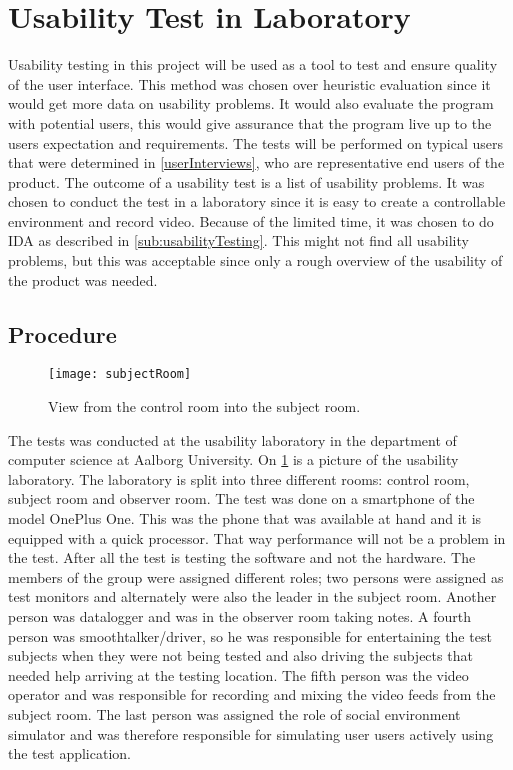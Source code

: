 \section{Usability Test in Laboratory}
Usability testing in this project will be used as a tool to test and
ensure quality of the user interface. This method was chosen over heuristic evaluation since it would get more data on usability problems. It would also evaluate the program with potential users, this would give assurance that the program live up to the users expectation and requirements. The tests will be performed on
typical users that were determined in \cref{userInterviews}, who are
representative end users of the product. The outcome of a usability
test is a list of usability problems. It was chosen to conduct the
test in a laboratory since it is easy to create a controllable
environment and record video. Because of the limited time, it was
chosen to do IDA as described in \cref{sub:usabilityTesting}. This
might not find all usability problems, but this was acceptable since
only a rough overview of the usability of the product was needed.

\subsection{Procedure}
\begin{figure}
  \centering
  \texttt{[image: subjectRoom]}
  \caption{View from the control room into the subject room.}
  \label{fig:subjectRoom}
\end{figure}
The tests was conducted at the usability laboratory in the department of computer science at Aalborg University. On \cref{fig:subjectRoom} is a picture of the usability laboratory. The laboratory is split into three different rooms: control room, subject room and observer room. The test was done on a smartphone of the model OnePlus One. This was
the phone that was available at hand and it is equipped with a quick
processor. That way performance will not be a problem in the
test. After all the test is testing the software and not the
hardware. The members of the group were assigned different roles; two
persons were assigned as test monitors and alternately were also the
leader in the subject room. Another person was datalogger and was in
the observer room taking notes. A fourth person was
smoothtalker/driver, so he was responsible for entertaining the test
subjects when they were not being tested and also driving the subjects
that needed help arriving at the testing location. The fifth person
was the video operator and was responsible for recording and mixing
the video feeds from the subject room. The last person was assigned
the role of social environment simulator and was therefore responsible
for simulating user users actively using the test application.

